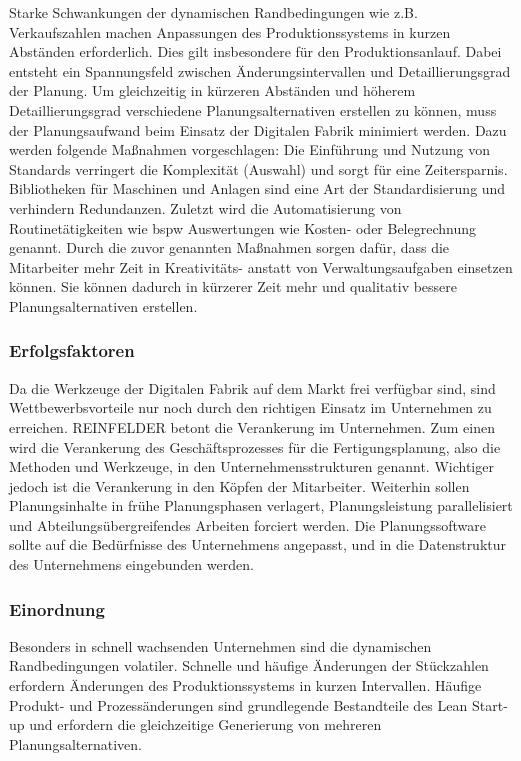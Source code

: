 Starke Schwankungen der dynamischen Randbedingungen wie z.B. Verkaufszahlen machen Anpassungen des Produktionssystems in kurzen Abständen erforderlich. Dies gilt insbesondere für den Produktionsanlauf. Dabei entsteht ein Spannungsfeld zwischen Änderungsintervallen und Detaillierungsgrad der Planung. Um gleichzeitig in kürzeren Abständen und höherem Detaillierungsgrad verschiedene Planungsalternativen erstellen zu können, muss der Planungsaufwand beim Einsatz der Digitalen Fabrik minimiert werden. 
Dazu werden folgende Maßnahmen vorgeschlagen: 
Die Einführung und Nutzung von Standards verringert die Komplexität (Auswahl) und sorgt für eine Zeitersparnis. Bibliotheken für Maschinen und Anlagen sind eine Art der Standardisierung und verhindern Redundanzen. Zuletzt wird die Automatisierung von Routinetätigkeiten wie \gls{bspw} Auswertungen wie Kosten- oder Belegrechnung genannt. %
Durch die zuvor genannten Maßnahmen sorgen dafür, dass die Mitarbeiter mehr Zeit in Kreativitäts- anstatt von Verwaltungsaufgaben einsetzen können. Sie können dadurch in kürzerer Zeit mehr und qualitativ bessere Planungsalternativen erstellen. 

\subsubsection{Erfolgsfaktoren}

Da die Werkzeuge der Digitalen Fabrik auf dem Markt frei verfügbar sind, sind Wettbewerbsvorteile nur noch durch den richtigen Einsatz im Unternehmen zu erreichen. 
REINFELDER betont die Verankerung im Unternehmen. Zum einen wird die Verankerung des Geschäftsprozesses für die Fertigungsplanung, also die Methoden und Werkzeuge, in den Unternehmensstrukturen genannt. Wichtiger jedoch ist die Verankerung in den Köpfen der Mitarbeiter. 
Weiterhin sollen Planungsinhalte in frühe Planungsphasen verlagert, Planungsleistung parallelisiert und Abteilungsübergreifendes Arbeiten forciert werden. Die Planungssoftware sollte auf die Bedürfnisse des Unternehmens angepasst, und in die Datenstruktur des Unternehmens eingebunden werden. 

\subsubsection{Einordnung}

Besonders in schnell wachsenden Unternehmen sind die dynamischen Randbedingungen volatiler. Schnelle und häufige Änderungen der Stückzahlen erfordern Änderungen des Produktionssystems in kurzen Intervallen. Häufige Produkt- und Prozessänderungen sind grundlegende Bestandteile des Lean Start-up und erfordern die gleichzeitige Generierung von mehreren Planungsalternativen. 

